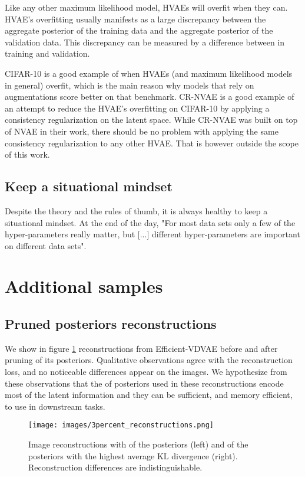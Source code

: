 \documentclass{article}
\begin{document}
Like any other maximum likelihood model, HVAEs will overfit when they can. HVAE's overfitting usually manifests as a large discrepancy between the aggregate posterior of the training data and the aggregate posterior of the validation data. This discrepancy can be measured by a difference between  in training and validation.

CIFAR-10 is a good example of when HVAEs (and maximum likelihood models in general) overfit, which is the main reason why models that rely on augmentations score better on that benchmark. CR-NVAE\cite{sinha2021consistency} is a good example of an attempt to reduce the HVAE's overfitting on CIFAR-10 by applying a consistency regularization on the latent space. While CR-NVAE was built on top of NVAE in their work, there should be no problem with applying the same consistency regularization to any other HVAE. That is however outside the scope of this work.

\subsection{Keep a situational mindset}

Despite the theory and the rules of thumb, it is always healthy to keep a situational mindset. At the end of the day, "For most data sets only a few of the hyper-parameters really matter, but [...] different hyper-parameters are important on different data sets"\cite{bergstra2012random}.

\section{Additional samples}\label{additional_samples_appendix}
\subsection{Pruned posteriors reconstructions}
We show in figure \ref{3percent_reconstructions_fig} reconstructions from Efficient-VDVAE before and after pruning  of its posteriors. Qualitative observations agree with the reconstruction loss, and no noticeable differences appear on the images. We hypothesize from these observations that the  of posteriors used in these reconstructions encode most of the latent information and they can be sufficient, and memory efficient, to use in downstream tasks.

\begin{figure}
    \centering
    \texttt{[image: images/3percent\_reconstructions.png]}
    \caption{Image reconstructions with  of the posteriors (left) and  of the posteriors with the highest average KL divergence (right). Reconstruction differences are indistinguishable.}
    \label{3percent_reconstructions_fig}
\end{figure}
\end{document}
